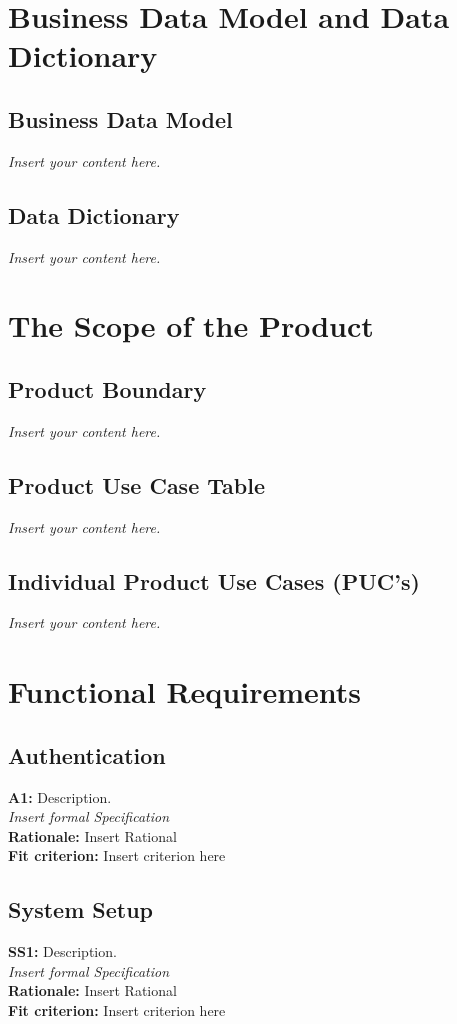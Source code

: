 \documentclass[12pt]{article}
\newcommand{\lips}{\textit{Insert your content here.}}
\begin{document}
\section{Business Data Model and Data Dictionary}
\subsection{Business Data Model}
\lips
\subsection{Data Dictionary}
\lips

\section{The Scope of the Product}
\subsection{Product Boundary}
\lips
\subsection{Product Use Case Table}
\lips
\subsection{Individual Product Use Cases (PUC's)}
\lips

\section{Functional Requirements}

\subsection{Authentication}
\textbf{A1: } Description.\\
\textit{Insert formal Specification}\\
\textbf{Rationale: } Insert Rational\\
\textbf{Fit criterion: } Insert criterion here 

\subsection{System Setup}
\textbf{SS1: } Description.\\
\textit{Insert formal Specification}\\
\textbf{Rationale: } Insert Rational\\
\textbf{Fit criterion: } Insert criterion here 
\end{document}
